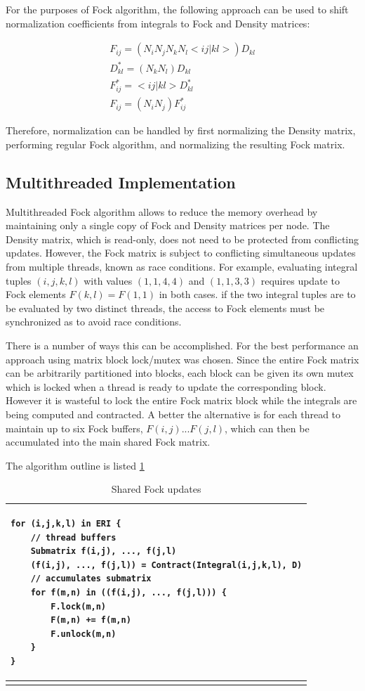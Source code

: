 \documentclass[12pt]{article}
\begin{document}
For the purposes of Fock algorithm, the following approach can be used
to shift normalization coefficients from integrals to Fock and Density
matrices:

\begin{eqnarray}
F_{ij} = (N_i N_j N_k N_l <ij|kl> ) D_{kl} \\
D^*_{kl} = (N_k N_l) D_{kl} \\
F^*_{ij} = <ij|kl> D^*_{kl} \\
F_{ij} = (N_i N_j) F^*_{ij}
\end{eqnarray}

Therefore, normalization can be handled by first normalizing the
Density matrix, performing regular Fock algorithm, and normalizing
the resulting Fock matrix.



\subsection*{Multithreaded Implementation}
Multithreaded Fock algorithm allows to reduce the memory overhead by
maintaining only a single copy of Fock and Density matrices per node.
The Density matrix, which is read-only, does not need to be protected
from conflicting updates.  However, the Fock matrix is subject to
conflicting simultaneous updates from multiple threads, known as race
conditions.  For example, evaluating integral tuples $(i,j,k,l)$ with
values $(1,1,4,4)$ and $(1,1,3,3)$ requires update to Fock elements
$F(k,l) = F(1,1)$ in both cases.  if the two integral tuples are to be
evaluated by two distinct threads, the access to Fock elements must be
synchronized as to avoid race conditions.

There is a number of ways this can be accomplished.  For the best
performance an approach using matrix block lock/mutex was chosen.  Since
the entire Fock matrix can be arbitrarily partitioned into blocks,
each block can be given its own mutex which is locked when a thread is
ready to update the corresponding block.  However it is wasteful to
lock the entire Fock matrix block while the integrals are being
computed and contracted.  A better the alternative is for each thread
to maintain up to six Fock buffers, $F(i, j) ... F(j,l)$, which can
then be accumulated into the main shared Fock matrix.

The algorithm outline is listed \ref{Fock:shared}

\begin{table}
\begin{tabular}{ p{6in} }
\hline
\begin{verbatim}
for (i,j,k,l) in ERI {
    // thread buffers
    Submatrix f(i,j), ..., f(j,l)
    (f(i,j), ..., f(j,l)) = Contract(Integral(i,j,k,l), D)
    // accumulates submatrix
    for f(m,n) in ((f(i,j), ..., f(j,l))) {
        F.lock(m,n)
        F(m,n) += f(m,n)
        F.unlock(m,n)
    }
}
\end{verbatim} \\
\hline
\label{Fock:shared}
\caption{Shared Fock updates}
\end{tabular}
\end{table}
\end{document}

